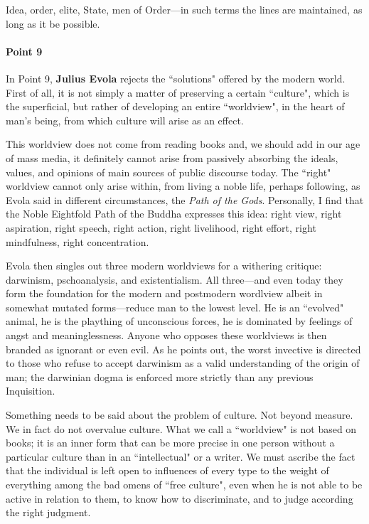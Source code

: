 Idea, order, elite, State, men of Order—in such terms the lines are maintained, as long as it be possible.

\paragraph{Point 9}
\begin{quotex}
In Point 9, \textbf{Julius Evola} rejects the ``solutions" offered by the modern world. First of all, it is not simply a matter of preserving a certain ``culture", which is the superficial, but rather of developing an entire ``worldview", in the heart of man's being, from which culture will arise as an effect.

This worldview does not come from reading books and, we should add in our age of mass media, it definitely cannot arise from passively absorbing the ideals, values, and opinions of main sources of public discourse today. The ``right" worldview cannot only arise within, from living a noble life, perhaps following, as Evola said in different circumstances, the \emph{Path of the Gods}. Personally, I find that the Noble Eightfold Path of the Buddha expresses this idea: right view, right aspiration, right speech, right action, right livelihood, right effort, right mindfulness, right concentration.

Evola then singles out three modern worldviews for a withering critique: darwinism, pschoanalysis, and existentialism. All three—and even today they form the foundation for the modern and postmodern wordlview albeit in somewhat mutated forms—reduce man to the lowest level. He is an ``evolved" animal, he is the plaything of unconscious forces, he is dominated by feelings of angst and meaninglessness. Anyone who opposes these worldviews is then branded as ignorant or even evil. As he points out, the worst invective is directed to those who refuse to accept darwinism as a valid understanding of the origin of man; the darwinian dogma is enforced more strictly than any previous Inquisition. 

\end{quotex}
Something needs to be said about the problem of culture. Not beyond measure. We in fact do not overvalue culture. What we call a ``worldview" is not based on books; it is an inner form that can be more precise in one person without a particular culture than in an ``intellectual" or a writer. We must ascribe the fact that the individual is left open to influences of every type to the weight of everything among the bad omens of ``free culture", even when he is not able to be active in relation to them, to know how to discriminate, and to judge according the right judgment.


